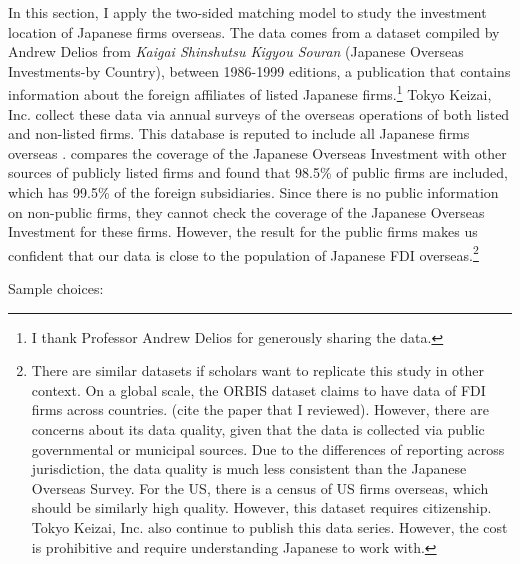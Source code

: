 In this section, I apply the two-sided matching model to study the investment
location of Japanese firms overseas. The data comes from a dataset compiled by
Andrew Delios from \textit{Kaigai
  Shinshutsu Kigyou Souran} (Japanese Overseas Investments-by Country), between
1986-1999 editions, a publication that contains information
about the foreign affiliates of listed Japanese firms.\footnote{I thank Professor Andrew Delios for
  generously sharing the data.} Tokyo Keizai, Inc. collect these data via annual
surveys of the overseas operations of both listed and non-listed firms. This database is reputed to include all Japanese
firms overseas \citep{Yamawaki1991}. \citep{Delios2001} compares the coverage of
the Japanese Overseas Investment with other sources of publicly listed firms and
found that 98.5\% of public firms are included, which has 99.5\% of the foreign
subsidiaries. Since there is no public information on non-public firms, they
cannot check the coverage of the Japanese Overseas Investment for these firms.
However, the result for the public firms makes us confident that our data is
close to the population of Japanese FDI overseas.\footnote{There are similar
  datasets if scholars want to replicate this study in other context. On a
  global scale, the ORBIS dataset claims to have data of FDI firms across
  countries. (cite the paper that I reviewed). However, there are concerns about
  its data quality, given that the data is collected via public governmental or
  municipal sources. Due to the differences of reporting across jurisdiction,
  the data quality is much less consistent than the Japanese Overseas Survey. For the US, there is a census of
  US firms overseas, which should be similarly high quality. However, this
  dataset requires citizenship. Tokyo Keizai, Inc. also continue to publish this
data series. However, the cost is prohibitive and require understanding Japanese
to work with.}



Sample choices:

